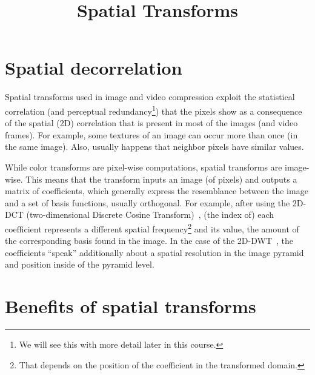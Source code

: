 
\title{Spatial Transforms}

\maketitle

\tableofcontents

\section{Spatial decorrelation}

Spatial transforms used in image and video compression exploit the
statistical correlation (and perceptual redundancy\footnote{We will
  see this with more detail later in this course.}) that the pixels
show as a consequence of the spatial (2D) correlation that is present
in most of the images (and video frames). For example, some textures of
an image can occur more than once (in the same image). Also, usually
happens that neighbor pixels have similar values.

While color transforms are pixel-wise computations, spatial transforms
are image-wise. This means that the transform inputs an image (of
pixels) and outputs a matrix of coefficients, which generally express
the resemblance between the image and a set of basis functions,
usually orthogonal. For example, after using the 2D-DCT
(two-dimensional Discrete Cosine Transform)~\cite{vruiz__DCT}, (the
index of) each coefficient represents a different spatial
frequency\footnote{That depends on the position of the coefficient in
  the transformed domain.} and its value, the amount of the
corresponding basis found in the image. In the case of the
2D-DWT~\cite{vruiz__DWT}, the coefficients ``speak'' additionally
about a spatial resolution in the image pyramid and position inside of
the pyramid level.


\section{Benefits of spatial transforms}

